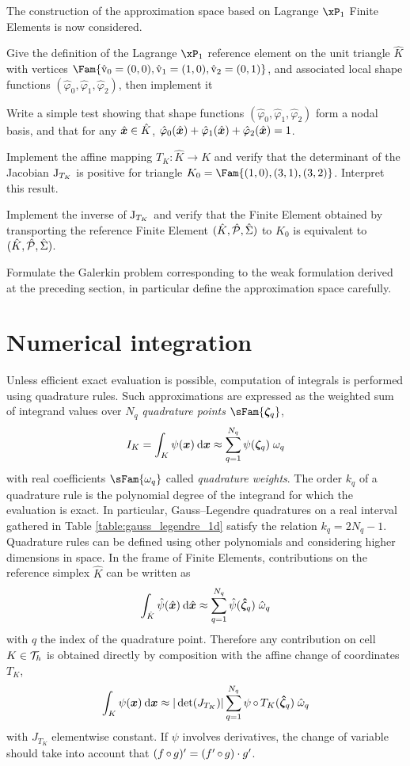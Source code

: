 \documentclass[assignment]{tmanotes}
\begin{document}
The construction of the approximation space based on Lagrange $\xPone$ Finite Elements is now considered.

\medskip
\begin{tmatsks}
\item Give the definition of the Lagrange $\xPone$ reference element on the unit triangle $\hat K$ with vertices $\Fam{ \hat\vertex_0 = (0,0), \hat\vertex_1 = (1,0), \hat\vertex_2 = (0,1)}$, and associated local shape functions $(\hat\varphi_0, \hat\varphi_1, \hat\varphi_2)$, then implement it
\item Write a simple test showing that shape functions $(\hat\varphi_0, \hat\varphi_1, \hat\varphi_2)$ form a nodal basis, and that for any $\hat{{{\boldsymbol x}}}\in\hat K$, $\hat\varphi_0(\hat{{{\boldsymbol x}}}) + \hat\varphi_1(\hat{{{\boldsymbol x}}}) + \hat\varphi_2(\hat{{{\boldsymbol x}}}) = 1$.
\item Implement the affine mapping $T_K: \hat K \rightarrow K$ and verify that the determinant of the Jacobian ${\mathrm J}_{T_K}$ is positive for triangle $K_0 = \Fam{ (1,0), (3,1), (3,2)}$. Interpret this result.
\item Implement the inverse of ${\mathrm J}_{T_K}$ and verify that the Finite Element obtained by transporting the reference Finite Element ${({\hat {{K}}},{\hat {{\mathcal P}}}, {\hat{{\Sigma}}})}$ to $K_0$ is equivalent to ${({\hat {{K}}},{\hat {{\mathcal P}}}, {\hat{{\Sigma}}})}$.
\item Formulate the Galerkin problem corresponding to the weak formulation derived at the preceding section, in particular define the approximation space carefully.
\end{tmatsks}

\section{Numerical integration}

Unless efficient exact evaluation is possible, computation of integrals is performed using quadrature rules.
Such approximations are expressed as the weighted sum of integrand values over $N_{q}$ \textit{quadrature points} $\sFam{\QRn{q}}$,
\[
I_K = \int_K \psi({{\boldsymbol x}}) \hspace{.5ex}{\mathrm d} {{\boldsymbol x}} \approx \sum_{q = 1}^{N_q} \psi(\boldsymbol\zeta_{q})\;\omega_{q}
\]
with real coefficients $\sFam{\omega_q}$ called \textit{quadrature weights}.
The order $k_q$ of a quadrature rule is the polynomial degree of the integrand for which the evaluation is exact.
In particular, Gauss--Legendre quadratures on a real interval gathered in Table \ref{table:gauss_legendre_1d} satisfy the relation $k_q = 2N_q - 1$.
Quadrature rules can be defined using other polynomials and considering higher dimensions in space.
In the frame of Finite Elements, contributions on the reference simplex $\hat K$ can be written as
\[
\int_{\hat {{K}}} \hat\psi(\hat{{\boldsymbol x}}) \hspace{.5ex}{\mathrm d} \hat{{\boldsymbol x}} \approx \sum_{q = 1}^{N_q} \hat\psi(\boldsymbol{\hat\zeta}_{q})\;\hat\omega_{q}
\]
with $q$ the index of the quadrature point.
Therefore any contribution on cell $K \in {\mathcal T}_h$ is obtained directly by composition with the affine change of coordinates $T_K$,
\[
\int_K \psi({{\boldsymbol x}}) \hspace{.5ex}{\mathrm d} {{\boldsymbol x}} \approx |\det(J_{T_K})|\sum_{q = 1}^{N_q} \psi\mathop{\circ}T_K(\boldsymbol{\hat\zeta}_{q})\;\hat\omega_{q}
\]
with $J_{T_K}$ elementwise constant.
If $\psi$ involves derivatives, the change of variable should take into account that $(f\mathop{\circ}g)' = (f'\mathop{\circ}g)\cdot g'$.
\end{document}
